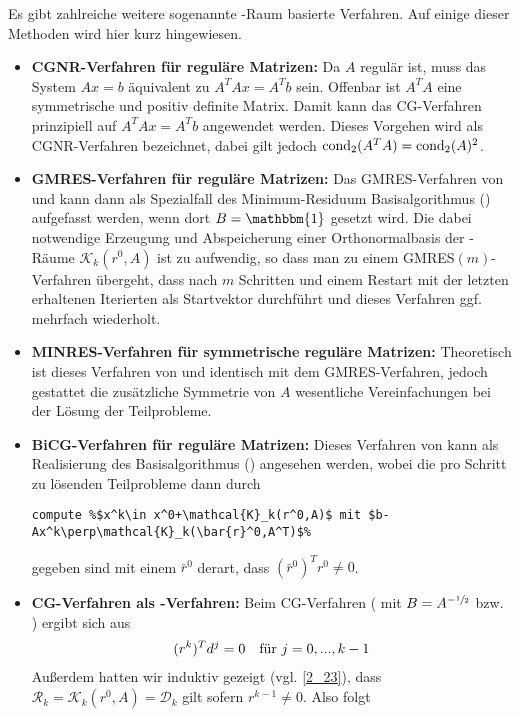 Es gibt zahlreiche weitere sogenannte -Raum basierte Verfahren. Auf einige dieser Methoden wird hier kurz hingewiesen.
\begin{itemize}
	\item \textbf{CGNR-Verfahren für reguläre Matrizen:} Da $A$ regulär ist, muss das System $Ax=b$ äquivalent zu $A^TAx=A^Tb$ sein. Offenbar ist $A^TA$ eine symmetrische und positiv definite Matrix. Damit kann das CG-Verfahren prinzipiell auf $A^TAx=A^Tb$ angewendet werden. Dieses Vorgehen wird als CGNR-Verfahren bezeichnet, dabei gilt jedoch $\operatorname{cond}_2(A^TA)=\operatorname{cond}_2(A)^2$.
	\item \textbf{GMRES-Verfahren für reguläre Matrizen:} Das GMRES-Verfahren von  und  kann dann als Spezialfall des Minimum-Residuum Basisalgorithmus () aufgefasst werden, wenn dort $B=\mathbbm{1}$ gesetzt wird. Die dabei notwendige Erzeugung und Abspeicherung einer Orthonormalbasis der -Räume $\mathcal{K}_k(r^0,A)$ ist zu aufwendig, so dass man zu einem GMRES$(m)$-Verfahren übergeht, dass nach $m$ Schritten und einem Restart mit der letzten erhaltenen Iterierten als Startvektor durchführt und dieses Verfahren ggf. mehrfach wiederholt.
	\item \textbf{MINRES-Verfahren für symmetrische reguläre Matrizen:} Theoretisch ist dieses Verfahren von  und  identisch mit dem GMRES-Verfahren, jedoch gestattet die zusätzliche Symmetrie von $A$ wesentliche Vereinfachungen bei der Lösung der Teilprobleme.
	\item \textbf{BiCG-Verfahren für reguläre Matrizen:} Dieses Verfahren von  kann als Realisierung des  Basisalgorithmus () angesehen werden, wobei die pro Schritt zu lösenden Teilprobleme dann durch
	\begin{lstlisting}
compute %$x^k\in x^0+\mathcal{K}_k(r^0,A)$ mit $b-Ax^k\perp\mathcal{K}_k(\bar{r}^0,A^T)$%
	\end{lstlisting}
	gegeben sind mit einem $\bar{r}^0$ derart, dass $(\bar{r}^0)^Tr^0\neq 0$.
	\item \textbf{CG-Verfahren als -Verfahren:} Beim CG-Verfahren ( mit $B=A^{-\sfrac{1}{2}}$ bzw. ) ergibt sich aus 
	\begin{align}
		(r^k)^Td^j=0\quad\text{für } j=0,...,k-1\notag
	\end{align}
	Außerdem hatten wir induktiv gezeigt (vgl. \cref{2_23}), dass $\mathcal{R}_k=\mathcal{K}_k(r^0,A)=\mathcal{D}_k$ gilt sofern $r^{k-1}\neq 0$. Also folgt

\end{itemize}
